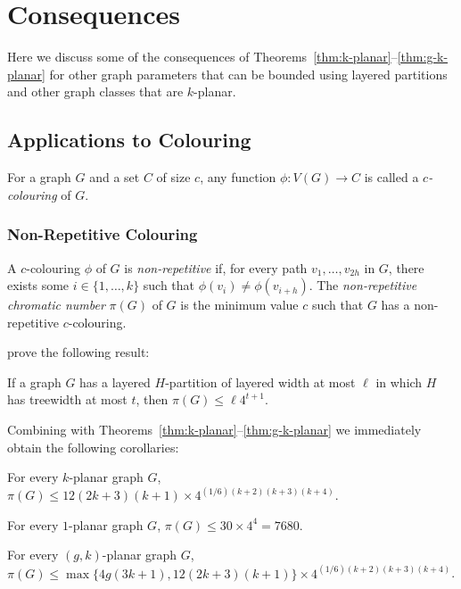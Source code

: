 \documentclass{patmorin}
\begin{document}
\section{Consequences}

Here we discuss some of the consequences of Theorems~\ref{thm:k-planar}--\ref{thm:g-k-planar} for other graph parameters that can be bounded using layered partitions and other graph classes that are $k$-planar.

\subsection{Applications to Colouring}

For a graph $G$ and a set $C$ of size $c$, any function $\phi\colon V(G)\to C$  is called a \emph{$c$-colouring} of $G$.  

\subsubsection{Non-Repetitive Colouring}

A $c$-colouring $\phi$ of $G$ is \emph{non-repetitive} if, for every path $v_1,\ldots,v_{2h}$ in $G$, there exists some $i\in\{1,\ldots,k\}$ such that $\phi(v_i)\neq\phi(v_{i+h})$.  The \emph{non-repetitive chromatic number} $\pi(G)$ of $G$ is the minimum value $c$ such that $G$ has a non-repetitive $c$-colouring.

\citet[Corollaries~9 and 10]{dujmovic.esperet.ea:planar} prove the following result:

\begin{lem}
  If a graph $G$ has a layered $H$-partition of layered width at most $\ell$ in which $H$ has treewidth at most $t$, then $\pi(G)\le \ell 4^{t+1}$.
\end{lem}

Combining  with Theorems~\ref{thm:k-planar}--\ref{thm:g-k-planar} we immediately obtain the following corollaries:

\begin{cor}
  For every $k$-planar graph $G$, $\pi(G)\le 12(2k+3)(k+1)\times 4^{(1/6)(k+2)(k+3)(k+4)}$.
\end{cor}

\begin{cor}
  For every $1$-planar graph $G$, $\pi(G)\le 30\times 4^4=7680$. 
\end{cor}

\begin{cor}
  For every $(g,k)$-planar graph $G$, $\pi(G)\le \max\{4g(3k+1),12(2k+3)(k+1)\}\times 4^{(1/6)(k+2)(k+3)(k+4)}$.
\end{cor}
\end{document}
